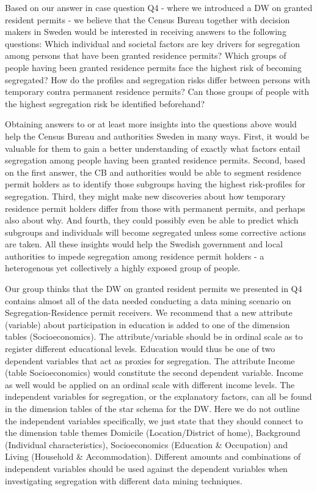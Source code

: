 Based on our answer in case question Q4 - where we introduced a DW on granted resident permits - 
we believe that the Census Bureau together with decision makers in Sweden would be interested in 
receiving answers to the following questions: 
Which individual and societal factors are key drivers for segregation among persons that have been granted residence permits? 
Which groups of people having been granted residence permits face the highest risk of becoming segregated? 
How do the profiles and segregation risks differ between persons with temporary contra permanent residence permits? 
Can those groups of people with the highest segregation risk be identified beforehand? 

Obtaining answers to or at least more insights into the questions above would help the Census Bureau and authorities Sweden in many ways.
First, it would be valuable for them to gain a better understanding of exactly what factors entail segregation among people 
having been granted residence permits. 
Second, based on the first answer, 
the CB and authorities would be able to segment residence permit holders as to identify those subgroups having 
the highest risk-profiles for segregation. 
Third, they might make new discoveries about how temporary residence permit holders differ from those with permanent permits, 
and perhaps also about why. And fourth, they could possibly even be able to predict which subgroups and individuals will 
become segregated unless some corrective actions are taken. 
All these insights would help the Swedish government and local authorities to impede segregation among residence permit holders - 
a heterogenous yet collectively a highly exposed group of people.  

Our group thinks that the DW on granted resident permits we presented in Q4 contains almost all of the data needed conducting a data mining
scenario on Segregation-Residence permit receivers. 
We recommend that a new attribute (variable) about participation in education is added to one of the dimension tables (Socioeconomics). 
The attribute/variable should be in ordinal scale as to register different educational levels. 
Education would thus be one of two dependent variables that act as proxies for segregation. 
The attribute Income (table Socioeconomics) would constitute the second dependent variable. 
Income as well would be applied on an ordinal scale with different income levels. 
The independent variables for segregation, or the explanatory factors, 
can all be found in the dimension tables of the star schema for the DW. 
Here we do not outline the independent variables specifically, 
we just state that they should connect to the dimension table themes Domicile (Location/District of home), 
Background (Individual characteristics), Socioeconomics (Education \& Occupation) and Living (Household \& Accommodation).
Different amounts and combinations of independent variables should be used against the dependent variables when 
investigating segregation with different data mining techniques.  

